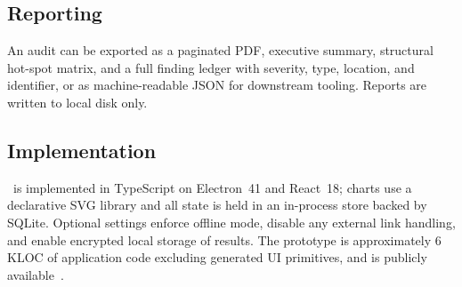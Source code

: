 \subsection{Reporting}
An audit can be exported as a paginated PDF, executive summary,
structural hot-spot matrix, and a full finding ledger with severity,
type, location, and identifier, or as machine-readable JSON for
downstream tooling. Reports are written to local disk only.

\subsection{Implementation}
\cs\ is implemented in TypeScript on Electron~41 and React~18; charts use
a declarative SVG library and all state is held in an in-process store
backed by SQLite. Optional settings enforce offline mode, disable any
external link handling, and enable encrypted local storage of results.
The prototype is approximately 6\,KLOC of application code excluding
generated UI primitives, and is publicly available~\cite{codesentinelrepo}.
